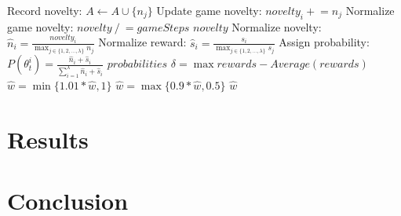 \documentclass[11 pt, twocolumn]{article}
\begin{document}
\begin{algorithm}
\begin{algorithmic}[1]
	  	\State Record novelty: $A\gets A\cup \{n_j\}$
	  	\State Update game novelty: $novelty_i\mathrel{+}= n_j$
	\EndFor
	\State Normalize game novelty: $novelty\mathrel{/}=gameSteps$
	\State \Return $novelty$
\EndFunction
\Statex
{}
		\State Normalize novelty: $\hat{n}_i = \frac{novelty_i}{\max_{j\in\{1,2,\dots,\lambda\}}n_j}$
		\State Normalize reward: $\hat{s}_i = \frac{s_i}{\max_{j\in\{1,2,\dots,\lambda\}}s_j}$
		\State Assign probability: $P(\theta_t^i)=\frac{\hat{n}_i+\hat{s}_i}{\sum_{i=1}^{\lambda}\hat{n}_i+\hat{s}_i}$
	\EndFor
	\State \Return $probabilities$
\EndFunction
\Statex
{}
	\State $\delta = \max rewards - Average(rewards)$
		\State $\hat{w}=\min \{1.01*\hat{w},1\}$
	\Else
		\State $\hat{w}=\max \{0.9*\hat{w},0.5\}$
	\EndIf
	\State \Return $\hat{w}$
\EndFunction
\end{algorithmic}
\end{algorithm}

\section{Results}
\section{Conclusion}

 

\end{document}
